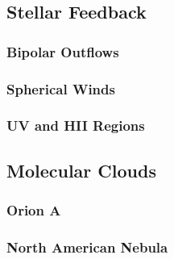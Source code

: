 \subsection{Stellar Feedback}\label{sec:feedback}

\subsubsection{Bipolar Outflows}\label{sec:outflow}

\subsubsection{Spherical Winds}\label{sec:wind}

\subsubsection{UV and HII Regions}\label{sec:uv}

\subsection{Molecular Clouds}\label{sec:clouds}

\subsubsection{Orion A}\label{sec:orion}

\subsubsection{North American Nebula}\label{sec:nan}
  
  
  
  
  